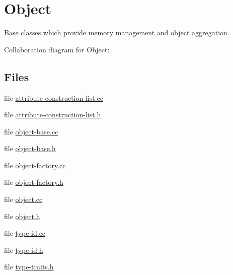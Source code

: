 \hypertarget{group__object}{}\section{Object}
\label{group__object}


Base classes which provide memory management and object aggregation.  


Collaboration diagram for Object\+:
\subsection*{Files}
\begin{DoxyCompactItemize}
\item 
file \hyperlink{attribute-construction-list_8cc}{attribute-\/construction-\/list.\+cc}
\item 
file \hyperlink{attribute-construction-list_8h}{attribute-\/construction-\/list.\+h}
\item 
file \hyperlink{object-base_8cc}{object-\/base.\+cc}
\item 
file \hyperlink{object-base_8h}{object-\/base.\+h}
\item 
file \hyperlink{object-factory_8cc}{object-\/factory.\+cc}
\item 
file \hyperlink{object-factory_8h}{object-\/factory.\+h}
\item 
file \hyperlink{object_8cc}{object.\+cc}
\item 
file \hyperlink{object_8h}{object.\+h}
\item 
file \hyperlink{type-id_8cc}{type-\/id.\+cc}
\item 
file \hyperlink{type-id_8h}{type-\/id.\+h}
\item 
file \hyperlink{type-traits_8h}{type-\/traits.\+h}
\end{DoxyCompactItemize}
